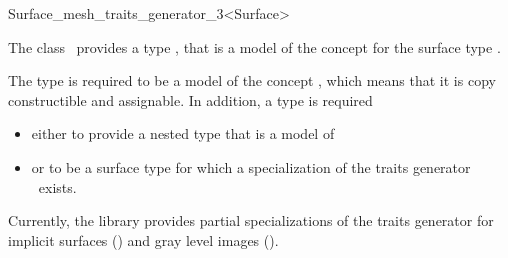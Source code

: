 

\begin{ccRefClass}{Surface_mesh_traits_generator_3<Surface>}  %


\ccDefinition
  
The class \ccRefName\ provides 
 a type , that is 
a model of the concept 
for the surface type .

The type  is required to be a model of the concept
,
which means that it is copy constructible
and assignable.
 In addition, a  type is required
\begin{itemize}
\item 
either to provide a nested type
that is a model of 
\item or to be a surface type for which a specialization
of the traits generator \ccRefName\ exists.
\end{itemize}
 

Currently, the library provides partial specializations
of  the   traits generator 
for implicit surfaces () and 
gray level images ().
 






\ccSeeAlso

  





\end{ccRefClass}


